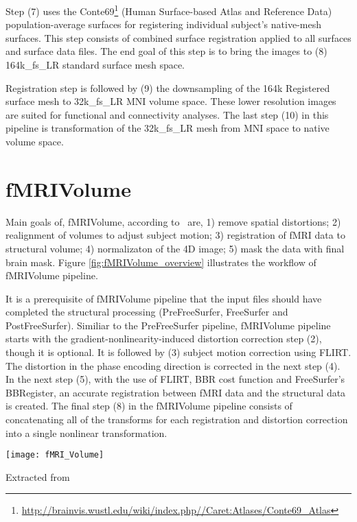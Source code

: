 Step (7) uses the Conte69\footnote{\url{http://brainvis.wustl.edu/wiki/index.php//Caret:Atlases/Conte69\_Atlas}} (Human Surface-based Atlas and Reference Data) population-average surfaces for registering individual subject's native-mesh surfaces. This step consists of combined surface registration applied to all surfaces and surface data files. The end goal of this step is to bring the images to (8) 164k\_fs\_LR standard surface mesh space. 

Registration step is followed by (9) the downsampling of the 164k Registered surface mesh to 32k\_fs\_LR MNI volume space. These lower resolution images are suited for functional and connectivity analyses. The last step (10) in this pipeline is transformation of the 32k\_fs\_LR mesh from MNI space to native volume space. 




\section{fMRIVolume} \label{sec:fMRIVolume}
Main goals of, fMRIVolume, according to~\cite{Gla13} are, 1) remove spatial distortions; 2) realignment of volumes to adjust subject motion; 3) registration of fMRI data to structural volume; 4) normalizaton of the 4D image; 5) mask the data with final brain mask. Figure \ref{fig:fMRIVolume_overview} illustrates the workflow of fMRIVolume pipeline.

It is a prerequisite of fMRIVolume pipeline that the input files should have completed the structural processing (PreFreeSurfer, FreeSurfer and PostFreeSurfer). Similiar to the PreFreeSurfer pipeline, fMRIVolume pipeline starts with the gradient-nonlinearity-induced distortion correction step (2), though it is optional. It is followed by (3) subject motion correction using FLIRT. The distortion in the phase encoding direction is corrected in the next step (4). In the next step (5), with the use of FLIRT, BBR cost function and FreeSurfer's BBRegister, an accurate registration between fMRI data and the structural data is created. The final step (8) in the fMRIVolume pipeline consists of concatenating all of the transforms for each registration and distortion correction into a single nonlinear transformation.

\begin{center}
  \texttt{[image: fMRI\_Volume]}
  \label{fig:fMRIVolume_overview}
  \caption*{Extracted from \cite{Gla13}}
\end{center}

